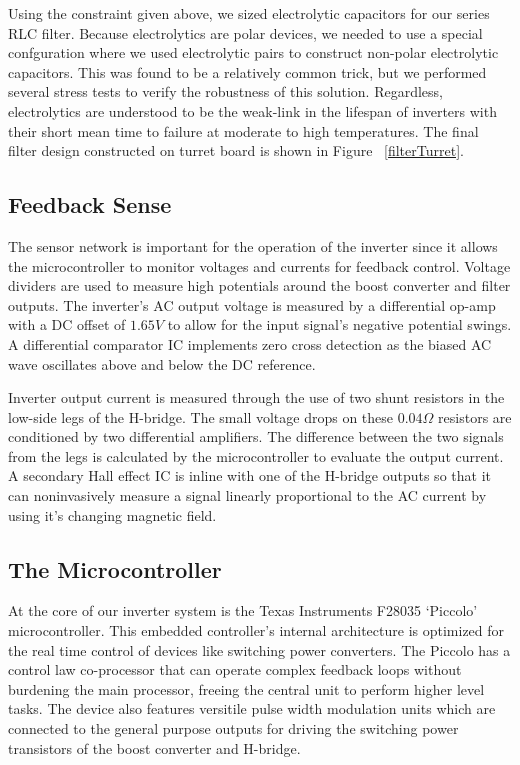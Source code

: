 Using the constraint given above, we sized electrolytic capacitors for our series RLC filter. Because electrolytics are polar devices, we needed to use a special confguration where we used electrolytic pairs to construct non-polar electrolytic capacitors. This was found to be a relatively common trick, but we performed several stress tests to verify the robustness of this solution. Regardless, electrolytics are understood to be the weak-link in the lifespan of inverters with their short mean time to failure at moderate to high temperatures. The final filter design constructed on turret board is shown in Figure ~\ref{filterTurret}.  



\subsection{Feedback Sense}
The sensor network is important for the operation of the inverter since it allows the microcontroller to monitor voltages and currents for feedback control. Voltage dividers are used to measure high potentials around the boost converter and filter outputs. The inverter's AC output voltage is measured by a differential op-amp with a DC offset of $1.65V$ to allow for the input signal's negative potential swings. A differential comparator IC implements zero cross detection as the biased AC wave oscillates above and below the DC reference. 

Inverter output current is measured through the use of two shunt resistors in the low-side legs of the H-bridge. The small voltage drops on these $0.04\Omega$ resistors are conditioned by two differential amplifiers. The difference between the two signals from the legs is calculated by the microcontroller to evaluate the output current. A secondary Hall effect IC is inline with one of the H-bridge outputs so that it can noninvasively measure a signal linearly proportional to the AC current by using it's changing magnetic field.

\subsection{The Microcontroller}
At the core of our inverter system is the Texas Instruments F28035 `Piccolo' microcontroller. This embedded controller's internal architecture is optimized for the real time control of devices like switching power converters. The Piccolo has a control law co-processor that can operate complex feedback loops without burdening the main processor, freeing the central unit to perform higher level tasks. The device also features versitile pulse width modulation units which are connected to the general purpose outputs for driving the switching power transistors of the boost converter and H-bridge. 

